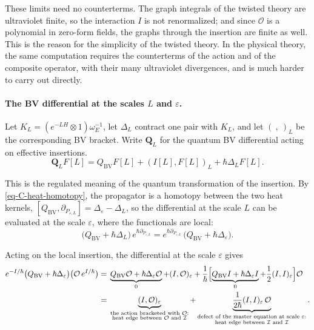 \documentclass[11pt]{article}
\numberwithin{equation}{section}
\numberwithin{figure}{section}
\numberwithin{table}{section}
\begin{document}
These limits need no counterterms. The graph integrals of the twisted theory are ultraviolet finite, so the interaction $I$ is not renormalized; and since $\mathcal O$ is a polynomial in zero-form fields, the graphs through the insertion are finite as well. This is the reason for the simplicity of the twisted theory. In the physical theory, the same computation requires the counterterms of the action and of the composite operator, with their many ultraviolet divergences, and is much harder to carry out directly.

\paragraph{The BV differential at the scales $L$ and $\varepsilon$.}

Let $K_L=(e^{-LH}\otimes1)\omega_E^{-1}$, let $\Delta_L$ contract one pair with $K_L$, and let $(\ ,\ )_L$ be the corresponding BV bracket. Write $\mathbf Q_L$ for the quantum BV differential acting on effective insertions.
\begin{equation*}
\mathbf Q_LF[L]
=Q_{\mathrm{BV}}F[L]+(I[L],F[L])_L+\hbar\Delta_LF[L].
\end{equation*}

This is the regulated meaning of the quantum transformation of the insertion. By \eqref{eq-C-heat-homotopy}, the propagator is a homotopy between the two heat kernels, $[Q_{\mathrm{BV}},\partial_{P_{\varepsilon,L}}]=\Delta_\varepsilon-\Delta_L$, so the differential at the scale $L$ can be evaluated at the scale $\varepsilon$, where the functionals are local:
\begin{equation}\label{eq-C-scale-intertwine}
\bigl(Q_{\mathrm{BV}}+\hbar\Delta_L\bigr)\,e^{\hbar\partial_{P_{\varepsilon,L}}}
=e^{\hbar\partial_{P_{\varepsilon,L}}}\,\bigl(Q_{\mathrm{BV}}+\hbar\Delta_\varepsilon\bigr).
\end{equation}

Acting on the local insertion, the differential at the scale $\varepsilon$ gives
\begin{equation}\label{eq-C-two-cuts}
\begin{aligned}
e^{-I/\hbar}\bigl(Q_{\mathrm{BV}}+\hbar\Delta_\varepsilon\bigr)\bigl(\mathcal O\,e^{I/\hbar}\bigr)
={}&\underbrace{Q_{\mathrm{BV}}\mathcal O+\hbar\Delta_\varepsilon\mathcal O}_{0}
+(I,\mathcal O)_\varepsilon
+\frac1\hbar\Bigl[\underbrace{Q_{\mathrm{BV}}I+\hbar\Delta_\varepsilon I}_{0}
+\frac12(I,I)_\varepsilon\Bigr]\mathcal O\\
={}&\underbrace{(I,\mathcal O)_\varepsilon}_{\substack{\text{the action bracketed with }\mathcal O:\\ \text{heat edge between }\mathcal O\text{ and }\mathcal I}}
+\underbrace{\frac1{2\hbar}(I,I)_\varepsilon\,\mathcal O}_{\substack{\text{defect of the master equation at scale }\varepsilon:\\ \text{heat edge between }\mathcal I\text{ and }\mathcal I}}.
\end{aligned}
\end{equation}
\end{document}
